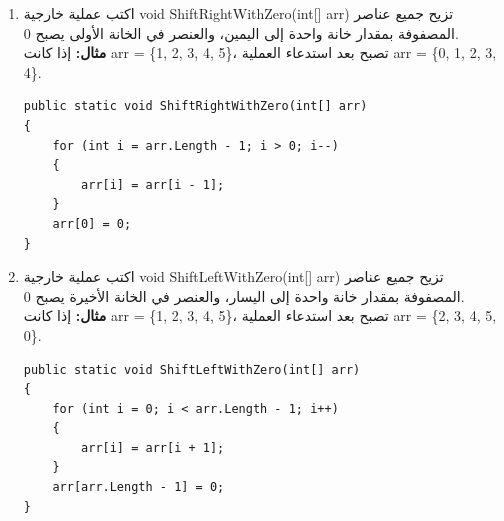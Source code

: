 \documentclass[14pt]{extarticle}
\begin{document}
\begin{enumerate}[resume, itemsep=2em]

    \item
    اكتب عملية خارجية \textenglish{void ShiftRightWithZero(int[] arr)} تزيح جميع عناصر المصفوفة بمقدار خانة واحدة إلى اليمين، والعنصر في الخانة الأولى يصبح 0.\\
    \textbf{مثال:} إذا كانت \textenglish{arr = \{1, 2, 3, 4, 5\}}، تصبح بعد استدعاء العملية \textenglish{arr = \{0, 1, 2, 3, 4\}}.
    \ifwithsols
    \begin{boxSolution}
    \begin{english}
    \begin{verbatim}
public static void ShiftRightWithZero(int[] arr)
{
    for (int i = arr.Length - 1; i > 0; i--)
    {
        arr[i] = arr[i - 1];
    }
    arr[0] = 0;
}
    \end{verbatim}
    \end{english}
    \end{boxSolution}
    \fi

    \item
    اكتب عملية خارجية \textenglish{void ShiftLeftWithZero(int[] arr)} تزيح جميع عناصر المصفوفة بمقدار خانة واحدة إلى اليسار، والعنصر في الخانة الأخيرة يصبح 0.\\
    \textbf{مثال:} إذا كانت \textenglish{arr = \{1, 2, 3, 4, 5\}}، تصبح بعد استدعاء العملية \textenglish{arr = \{2, 3, 4, 5, 0\}}.
    \ifwithsols
    \begin{boxSolution}
    \begin{english}
    \begin{verbatim}
public static void ShiftLeftWithZero(int[] arr)
{
    for (int i = 0; i < arr.Length - 1; i++)
    {
        arr[i] = arr[i + 1];
    }
    arr[arr.Length - 1] = 0;
}
    \end{verbatim}
    \end{english}
    \end{boxSolution}
    \fi


\end{enumerate}
\end{document}
